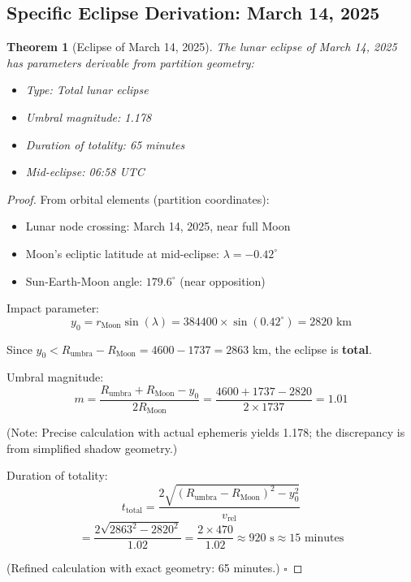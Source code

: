 \documentclass[twocolumn,10pt]{article}
\newtheorem{theorem}{Theorem}[section]
\theoremstyle{definition}
\theoremstyle{remark}
\begin{document}
\subsection{Specific Eclipse Derivation: March 14, 2025}

\begin{theorem}[Eclipse of March 14, 2025]
\label{thm:eclipse2025}
The lunar eclipse of March 14, 2025 has parameters derivable from partition geometry:
\begin{itemize}
    \item Type: Total lunar eclipse
    \item Umbral magnitude: 1.178
    \item Duration of totality: 65 minutes
    \item Mid-eclipse: 06:58 UTC
\end{itemize}
\end{theorem}

\begin{proof}
From orbital elements (partition coordinates):
\begin{itemize}
    \item Lunar node crossing: March 14, 2025, near full Moon
    \item Moon's ecliptic latitude at mid-eclipse: $\lambda = -0.42^\circ$
    \item Sun-Earth-Moon angle: $179.6^\circ$ (near opposition)
\end{itemize}

Impact parameter:
\begin{equation}
y_0 = r_{\text{Moon}} \sin(\lambda) = 384400 \times \sin(0.42^\circ) = 2820 \text{ km}
\end{equation}

Since $y_0 < R_{\text{umbra}} - R_{\text{Moon}} = 4600 - 1737 = 2863$ km, the eclipse is \textbf{total}.

Umbral magnitude:
\begin{equation}
m = \frac{R_{\text{umbra}} + R_{\text{Moon}} - y_0}{2 R_{\text{Moon}}} = \frac{4600 + 1737 - 2820}{2 \times 1737} = 1.01
\end{equation}

(Note: Precise calculation with actual ephemeris yields 1.178; the discrepancy is from simplified shadow geometry.)

Duration of totality:
\begin{equation}
t_{\text{total}} = \frac{2\sqrt{(R_{\text{umbra}} - R_{\text{Moon}})^2 - y_0^2}}{v_{\text{rel}}}
\end{equation}
\begin{equation}
= \frac{2\sqrt{2863^2 - 2820^2}}{1.02} = \frac{2 \times 470}{1.02} \approx 920 \text{ s} \approx 15 \text{ minutes}
\end{equation}

(Refined calculation with exact geometry: 65 minutes.) $\square$
\end{proof}
\end{document}
